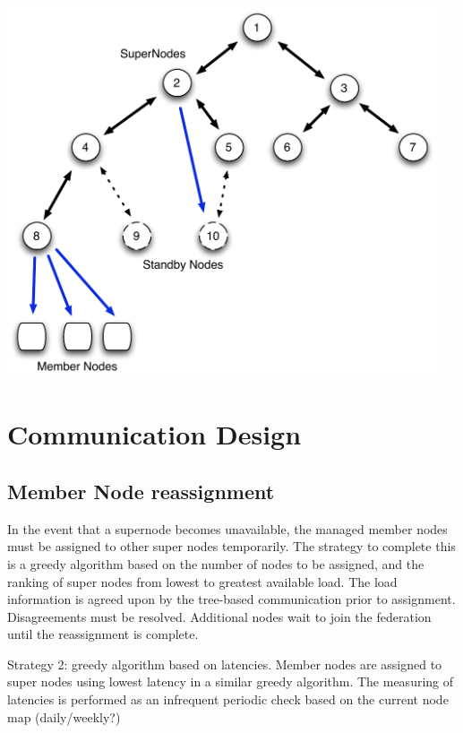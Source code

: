 \documentclass[oneside,12pt]{memoir}
\begin{document}
\begin{center}
\includegraphics[width=5in]{presentation/Node-comm-v2.pdf}
\end{center}

\section{Communication Design}

\subsection{Member Node reassignment}

In the event that a supernode becomes unavailable, the managed member nodes must be assigned to other super nodes temporarily.  The strategy to complete this is a greedy algorithm based on the number of nodes to be assigned, and the ranking of super nodes from lowest to greatest available load.  The load information is agreed upon by the tree-based communication prior to assignment.  Disagreements must be resolved.  Additional nodes wait to join the federation until the reassignment is complete.  

Strategy 2:  greedy algorithm based on latencies.  Member nodes are assigned to super nodes using lowest latency in a similar greedy algorithm.  The measuring of latencies is performed as an infrequent periodic check based on the current node map (daily/weekly?)
\end{document}
